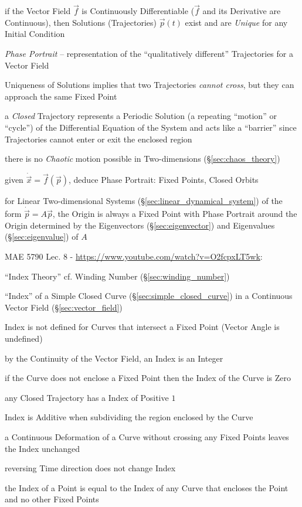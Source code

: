 if the Vector Field $\vec{f}$ is Continuously Differentiable ($\vec{f}$ and its
Derivative are Continuous), then Solutions (Trajectories) $\vec{p}(t)$ exist
and are \emph{Unique} for any Initial Condition

\emph{Phase Portrait} -- representation of the ``qualitatively different''
Trajectories for a Vector Field

Uniqueness of Solutions implies that two Trajectories \emph{cannot cross}, but
they can approach the same Fixed Point

a \emph{Closed} Trajectory represents a Periodic Solution (a repeating
``motion'' or ``cycle'') of the Differential Equation of the System and acts
like a ``barrier'' since Trajectories cannot enter or exit the enclosed region

there is no \emph{Chaotic} motion possible in Two-dimensions
(\S\ref{sec:chaos_theory})

given $\dot{\vec{x}} = \vec{f}(\vec{p})$, deduce Phase Portrait: Fixed Points,
Closed Orbits

for Linear Two-dimensional Systems (\S\ref{sec:linear_dynamical_system}) of the
form $\dot{\vec{p}} = A\vec{p}$, the Origin is always a Fixed Point with Phase
Portrait around the Origin determined by the Eigenvectors
(\S\ref{sec:eigenvector}) and Eigenvalues (\S\ref{sec:eigenvalue}) of $A$


MAE 5790 Lec. 8 - \url{https://www.youtube.com/watch?v=O2fcpxLT5wk}:

``Index Theory'' \fist cf. Winding Number (\S\ref{sec:winding_number})

``Index'' of a Simple Closed Curve (\S\ref{sec:simple_closed_curve}) in a
Continuous Vector Field (\S\ref{sec:vector_field})

Index is not defined for Curves that intersect a Fixed Point (Vector Angle is
undefined)

by the Continuity of the Vector Field, an Index is an Integer

if the Curve does not enclose a Fixed Point then the Index of the Curve is Zero

any Closed Trajectory has a Index of Positive $1$

Index is Additive when subdividing the region enclosed by the Curve

a Continuous Deformation of a Curve without crossing any Fixed Points leaves
the Index unchanged

reversing Time direction does not change Index

the Index of a Point is equal to the Index of any Curve that encloses the Point
and no other Fixed Points

